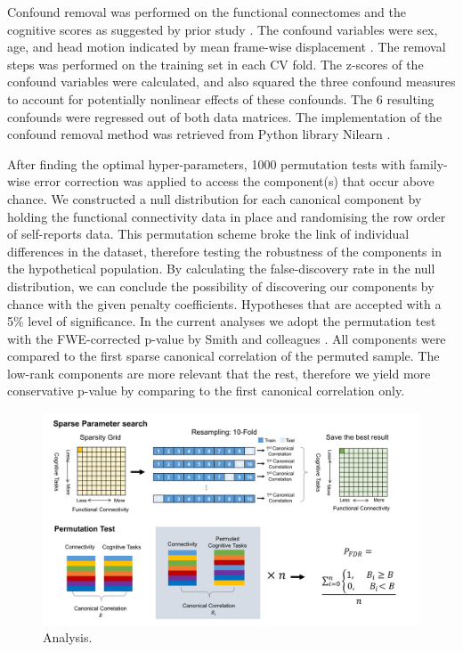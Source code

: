 Confound removal was performed on the functional connectomes and the cognitive scores as suggested by prior study \cite{Smith2015}. 
The confound variables were sex, age, and head motion indicated by mean frame-wise displacement \cite{Jenkinson2002}.
The  removal  steps  was  performed  on  the training set in each CV fold. The z-scores of the confound variables were calculated, and also squared the three confound measures to account for potentially nonlinear effects of these confounds. The 6 resulting confounds were regressed out of both data matrices. 
The implementation of the confound removal method \cite{Friston1994} was retrieved from Python library Nilearn \cite[ \url{http://nilearn.github.io/}, version 0.3.1]{Abraham2014}.

After finding the optimal hyper-parameters, 1000 permutation tests with family-wise error correction was applied to access the component(s) that occur above chance. We constructed a null distribution for each canonical component by holding the functional connectivity data in place and randomising the row order of self-reports data. This permutation scheme broke the link of individual differences in the dataset, therefore testing the robustness of the components in the hypothetical population. By calculating the false-discovery rate in the null distribution, we can conclude the possibility of discovering our components by chance with the given penalty coefficients. Hypotheses that are accepted with a 5\% level of significance. In the current analyses we adopt the permutation test with the FWE-corrected p-value by Smith and colleagues \citeyear{Smith2015}. All components were compared to the first sparse canonical correlation of the permuted sample. The low-rank components are more relevant that the rest, therefore we yield more conservative p-value by comparing to the first canonical correlation only. 

\begin{figure}[H]
	\centering
	\includegraphics[width=1\textwidth]{chapters/img/study3fig1.png}
	\caption{Analysis.} 
	\label{fig:study3:fig1}
\end{figure}

